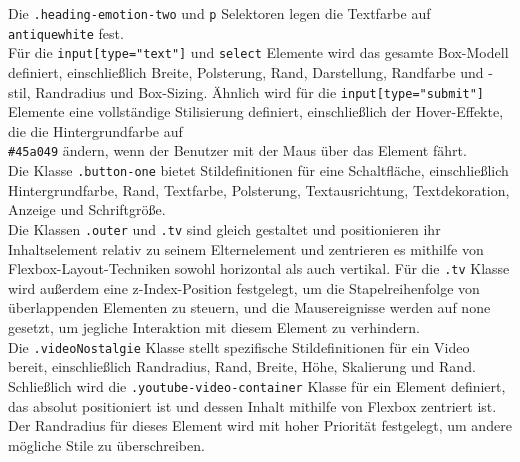 \documentclass[./dokumentation.tex]{subfiles}
\begin{document}
Die \verb+.heading-emotion-two+ und \verb+p+ Selektoren legen die Textfarbe auf \verb+antiquewhite+ fest.\\
Für die \verb+input[type="text"]+ und \verb+select+ Elemente wird das gesamte Box-Modell definiert, einschließlich Breite, Polsterung, Rand, Darstellung, Randfarbe und -stil, Randradius und Box-Sizing. Ähnlich wird für die \verb+input[type="submit"]+ Elemente eine vollständige Stilisierung definiert, einschließlich der Hover-Effekte, die die Hintergrundfarbe auf\\ \verb+#45a049+ ändern, wenn der Benutzer mit der Maus über das Element fährt.\\
Die Klasse \verb+.button-one+ bietet Stildefinitionen für eine Schaltfläche, einschließlich Hintergrundfarbe, Rand, Textfarbe, Polsterung, Textausrichtung, Textdekoration, Anzeige und Schriftgröße.\\
Die Klassen \verb+.outer+ und \verb+.tv+ sind gleich gestaltet und positionieren ihr Inhaltselement relativ zu seinem Elternelement und zentrieren es mithilfe von Flexbox-Layout-Techniken sowohl horizontal als auch vertikal. Für die \verb+.tv+ Klasse wird außerdem eine z-Index-Position festgelegt, um die Stapelreihenfolge von überlappenden Elementen zu steuern, und die Mausereignisse werden auf none gesetzt, um jegliche Interaktion mit diesem Element zu verhindern.\\
Die \verb+.videoNostalgie+ Klasse stellt spezifische Stildefinitionen für ein Video bereit, einschließlich Randradius, Rand, Breite, Höhe, Skalierung und Rand.\\
Schließlich wird die \verb+.youtube-video-container+ Klasse für ein Element definiert, das absolut positioniert ist und dessen Inhalt mithilfe von Flexbox zentriert ist. Der Randradius für dieses Element wird mit hoher Priorität festgelegt, um andere mögliche Stile zu überschreiben.
\end{document}
